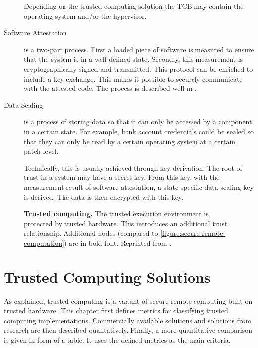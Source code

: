 \begin{description}
Depending on the trusted computing solution the TCB may contain the operating system and/or the hypervisor.\label{ID_962329179}
\item[Software Attestation] is a two-part process. First a loaded piece of software is measured to ensure that the system is in a well-defined state. Secondly, this measurement is cryptographically signed and transmitted. This protocol can be enriched to include a key exchange. This makes it possible to securely communicate with the attested code. The process is described well in \cite{sgx-explained}.\label{ID_372928242}
\item[Data Sealing] is a process of storing data so that it can only be accessed by a component in a certain state. For example, bank account credentials could be sealed so that they can only be read by a certain operating system at a certain patch-level.\cite[]{Mitchell2005}\label{ID_708201927}

Technically, this is usually achieved through key derivation. The root of trust in a system may have a secret key. From this key, with the measurement result of software attestation, a state-specific data sealing key is derived. The data is then encrypted with this key.\label{ID_1904605343}
\end{description}\label{ID_242504118}
\begin{figure}[htbp]
\makebox[\textwidth][c]{
}\caption{\textbf{Trusted computing.}\label{ID_1038375068}
The trusted execution environment is protected by trusted hardware. This introduces an additional trust relationship. Additional nodes (compared to \autoref{figure:secure-remote-computation}) are in bold font.\label{ID_1467217011}
Reprinted from \cite{sgx-explained}.\label{ID_1474157281}
\label{ID_1792311294}\label{figure:trusted-computing}}
\end{figure}


\chapter{Trusted Computing Solutions\label{ID_309872773}\label{chapter:tc-solutions}}
As explained, trusted computing is a variant of secure remote computing built on trusted hardware.\label{ID_1898011333}
This chapter first defines metrics for classifying trusted computing implementations.\label{ID_268617658}
Commercially available solutions and solutions from research are then described qualitatively.\label{ID_1980391789}
Finally, a more quantitative comparison is given in form of a table. It uses the defined metrics as the main criteria.\label{ID_1605459160}

